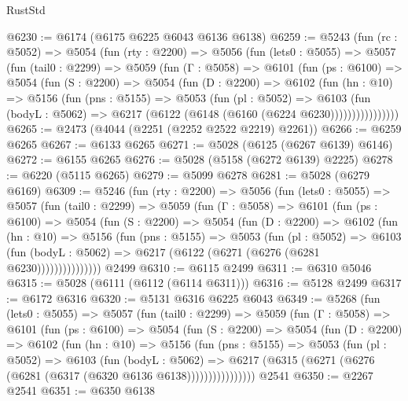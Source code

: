 \begin{lexlean}{RustStd}
\begin{coremodule}
{\begin{coremodule}
{{{{{{{{{{{{@6230 := @6174 (@6175 @6225 @6043 @6136 @6138)
@6259 := @5243
    (fun (rc : @5052) =>
    @5054
      (fun (rty : @2200) =>
      @5056
        (fun (lets0 : @5055) =>
        @5057
          (fun (tail0 : @2299) =>
          @5059
            (fun (Γ : @5058) =>
            @6101
              (fun (ps : @6100) =>
              @5054
                (fun (S : @2200) =>
                @5054
                  (fun (D : @2200) =>
                  @6102
                    (fun (hn : @10) =>
                    @5156
                      (fun (pns : @5155) =>
                      @5053
                        (fun (pl : @5052) =>
                        @6103
                          (fun (bodyL : @5062) =>
                          @6217 (@6122 (@6148 (@6160 (@6224 @6230))))))))))))))))
@6265 := @2473 (@4044 (@2251 (@2252 @2522 @2219) @2261))
@6266 := @6259 @6265
@6267 := @6133 @6265
@6271 := @5028 (@6125 (@6267 @6139) @6146)
@6272 := @6155 @6265
@6276 := @5028 (@5158 (@6272 @6139) @2225)
@6278 := @6220 (@5115 @6265)
@6279 := @5099 @6278
@6281 := @5028 (@6279 @6169)
@6309 := @5246
    (fun (rty : @2200) =>
    @5056
      (fun (lets0 : @5055) =>
      @5057
        (fun (tail0 : @2299) =>
        @5059
          (fun (Γ : @5058) =>
          @6101
            (fun (ps : @6100) =>
            @5054
              (fun (S : @2200) =>
              @5054
                (fun (D : @2200) =>
                @6102
                  (fun (hn : @10) =>
                  @5156
                    (fun (pns : @5155) =>
                    @5053
                      (fun (pl : @5052) =>
                      @6103
                        (fun (bodyL : @5062) =>
                        @6217 (@6122 (@6271 (@6276 (@6281 @6230)))))))))))))))
    @2499
@6310 := @6115 @2499
@6311 := @6310 @5046
@6315 := @5028 (@6111 (@6112 (@6114 @6311)))
@6316 := @5128 @2499
@6317 := @6172 @6316
@6320 := @5131 @6316 @6225 @6043
@6349 := @5268
    (fun (lets0 : @5055) =>
    @5057
      (fun (tail0 : @2299) =>
      @5059
        (fun (Γ : @5058) =>
        @6101
          (fun (ps : @6100) =>
          @5054
            (fun (S : @2200) =>
            @5054
              (fun (D : @2200) =>
              @6102
                (fun (hn : @10) =>
                @5156
                  (fun (pns : @5155) =>
                  @5053
                    (fun (pl : @5052) =>
                    @6103
                      (fun (bodyL : @5062) =>
                      @6217 (@6315 (@6271 (@6276 (@6281 (@6317 (@6320 @6136 @6138))))))))))))))))
    @2541
@6350 := @2267 @2541
@6351 := @6350 @6138
}}}}}}}}}}}}
\end{coremodule}}
\end{coremodule}
\end{lexlean}
